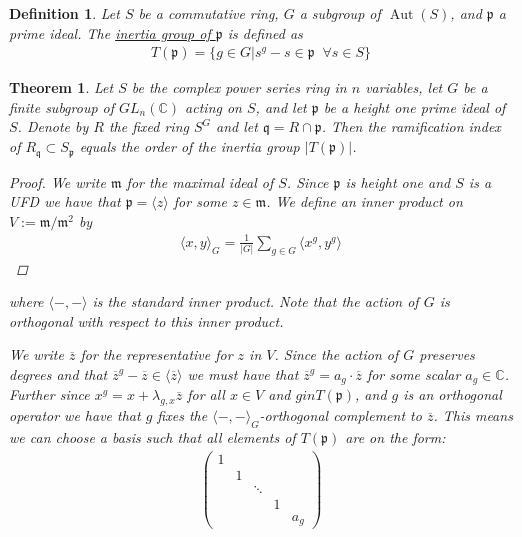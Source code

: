 \documentclass[11pt, a4paper, english]{article}
\numberwithin{prop}{section}
\numberwithin{lemma}{section}
\newtheorem{theorem}{Theorem}
\numberwithin{theorem}{section}
\newtheorem{defin}{Definition}
\numberwithin{defin}{section}
\numberwithin{example}{section}
\newcommand{\C}{\mathbb{C}}
\DeclareMathOperator{\Aut}{Aut}
\begin{document}
\begin{defin}
Let $S$ be a commutative ring, $G$ a subgroup of $\Aut(S)$, and $\mathfrak{p}$ a prime ideal. The \underline{inertia group of $\mathfrak{p}$} is defined as
\begin{align*}
T(\mathfrak{p}) = \{ g \in G | s^g - s \in \mathfrak{p} \;\; \forall s \in S \}
\end{align*}
\end{defin}

\begin{theorem}
Let $S$ be the complex power series ring in $n$ variables, let $G$ be  a finite subgroup of $GL_n(\C)$ acting on $S$, and let $\mathfrak{p}$ be a height one prime ideal of $S$. Denote by $R$ the fixed ring $S^G$ and let $\mathfrak{q} = R \cap \mathfrak{p}$. Then the ramification index of $R_\mathfrak{q} \subset S_\mathfrak{p}$ equals the order of the inertia group $|T(\mathfrak{p})|$.

\begin{proof}
We write $\mathfrak{m}$ for the maximal ideal of $S$. Since $\mathfrak{p}$ is height one and $S$ is a UFD we have that $\mathfrak{p} = \langle z \rangle$ for some $z \in \mathfrak{m}$. We define an inner product on $V := \mathfrak{m}/\mathfrak{m}^2$ by
\begin{align*}
\langle x, y \rangle_G = \frac{1}{|G|} \sum_{g \in G} \langle x^g,  y^g \rangle
\end{align*}
\end{proof}
where $\langle -,- \rangle$ is the standard inner product. Note that the action of $G$ is orthogonal with respect to this inner product.

We write $\overline{z}$ for the representative for $z$ in $V$. Since the action of $G$ preserves degrees and that $\overline{z}^g - \overline{z} \in \langle \overline{z} \rangle$ we must have that $\overline{z}^g = a_g \cdot \overline{z}$ for some scalar $a_g \in \C$. Further since $x^g = x + \lambda_{g,x}\overline{z}$ for all $x \in V$ and $g in T(\mathfrak{p})$, and $g$ is an orthogonal operator we have that $g$ fixes the $\langle -,- \rangle_G$-orthogonal complement to $\overline{z}$. This means we can choose a basis such that all elements of $T(\mathfrak{p})$ are on the form:
\begin{align*}
\begin{pmatrix}
1\\
& 1\\
&& \ddots\\
&&&1\\
&&&& a_g
\end{pmatrix}
\end{align*}


\end{theorem}
\end{document}
